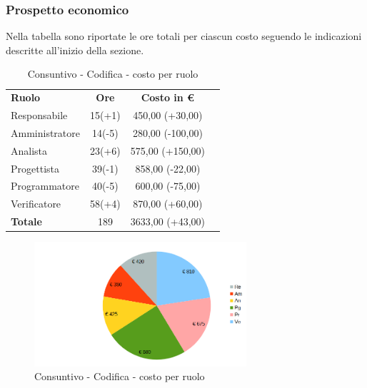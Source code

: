 \subsubsection{Prospetto economico}
Nella tabella sono riportate le ore totali per ciascun costo seguendo le indicazioni descritte all'inizio della sezione.

\begin{table} [h!]
	\begin{center}
		\begin{tabular} { m{3 cm} c c c  }
			\rowcolor{lightgray}
			\textbf{Ruolo}  & \textbf{Ore} & \textbf{Costo in \euro} \\
			Responsabile    & 15(+1)      & 450,00 (+30,00) \\
			Amministratore  & 14(-5)      & 280,00 (-100,00)  \\
			Analista        & 23(+6)     & 575,00 (+150,00) \\
			Progettista     & 39(-1)          & 858,00 (-22,00) \\
			Programmatore   & 40(-5)        & 600,00 (-75,00) \\
			Verificatore    & 58(+4)        & 870,00 (+60,00) \\
			\textbf{Totale} & 189         & 3633,00 (+43,00) \\
			
		\end{tabular}
		\caption{Consuntivo - Codifica  - costo per ruolo}
	\end{center}
\end{table}
\begin{figure} [h!]
	\centering
	\includegraphics[width=0.7\textwidth]{res/img/grafici/consuntivo-torta-tb.png}
	\caption{Consuntivo - Codifica  - costo per ruolo} 
\end{figure}
